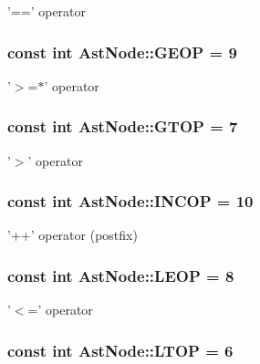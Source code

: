 \label{classAstNode_a9cb6a842a496aed85756aa779789ce77}
'==' operator \hypertarget{classAstNode_aeb92e9f6e1407ff0c945f220b3da9820}{
\subsubsection[{GEOP}]{\setlength{\rightskip}{0pt plus 5cm}const int {\bf AstNode::GEOP} = 9}}
\label{classAstNode_aeb92e9f6e1407ff0c945f220b3da9820}
'$>$=$\ast$' operator \hypertarget{classAstNode_a3103a273c9da38b092334c757ee19ace}{
\subsubsection[{GTOP}]{\setlength{\rightskip}{0pt plus 5cm}const int {\bf AstNode::GTOP} = 7}}
\label{classAstNode_a3103a273c9da38b092334c757ee19ace}
'$>$' operator \hypertarget{classAstNode_abf9092d925819312d2547c414b493c4f}{
\subsubsection[{INCOP}]{\setlength{\rightskip}{0pt plus 5cm}const int {\bf AstNode::INCOP} = 10}}
\label{classAstNode_abf9092d925819312d2547c414b493c4f}
'++' operator (postfix) \hypertarget{classAstNode_ac62da8b0313271a74293826f586dd6ea}{
\subsubsection[{LEOP}]{\setlength{\rightskip}{0pt plus 5cm}const int {\bf AstNode::LEOP} = 8}}
\label{classAstNode_ac62da8b0313271a74293826f586dd6ea}
'$<$=' operator \hypertarget{classAstNode_a1ddf9dbcce4b80d311e7080b8262b65b}{
\subsubsection[{LTOP}]{\setlength{\rightskip}{0pt plus 5cm}const int {\bf AstNode::LTOP} = 6}}
